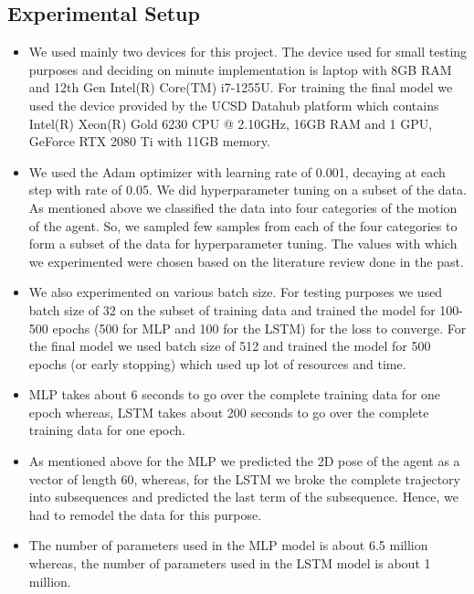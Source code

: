 \documentclass{article}
\begin{document}
\subsection{Experimental Setup}
\begin{itemize}
\item We used mainly two devices for this project. The device used for small testing purposes and deciding on minute implementation is 
laptop with 8GB RAM and 12th Gen Intel(R) Core(TM) i7-1255U. For training the final model we used the device provided by the 
UCSD Datahub platform which contains Intel(R) Xeon(R) Gold 6230 CPU @ 2.10GHz, 16GB RAM and 1 GPU, GeForce RTX 2080 Ti with 11GB memory. 
\item We used the Adam optimizer with learning rate of 0.001, decaying at each step with rate of 0.05. We did hyperparameter tuning on a subset of the data.
As mentioned above we classified the data into four categories of the motion of the agent. So, we sampled few samples from each of the four categories to form a subset of the data for hyperparameter tuning.
The values with which we experimented were chosen based on the literature review done in the past.
\item We also experimented on various batch size. For testing purposes we used batch size of 32 on the subset of training data and trained 
the model for 100-500 epochs (500 for MLP and 100 for the LSTM) for the loss to converge. For the final model we used batch size of 512 and trained the model for 500 epochs (or early stopping) which used up lot of resources and time.
\item MLP takes about 6 seconds to go over the complete training data for one epoch whereas, LSTM takes about 200 seconds to go over the complete training data for one epoch.
\item As mentioned above for the MLP we predicted the 2D pose of the agent as a vector of length 60, whereas, for the LSTM we broke the complete trajectory into subsequences and predicted the last term of the subsequence. Hence, we had to remodel the data for this purpose.
\item The number of parameters used in the MLP model is about 6.5 million whereas, the number of parameters used in the LSTM model is about 1 million.
\end{itemize}
\end{document}
